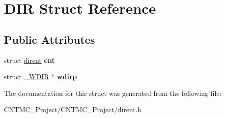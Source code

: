 \hypertarget{struct_d_i_r}{}\section{D\+I\+R Struct Reference}
\label{struct_d_i_r}
\subsection*{Public Attributes}
\begin{DoxyCompactItemize}
\item 
\hypertarget{struct_d_i_r_a59e9f5211cbb2f8e5b2807ccfdd2a7fc}{}struct \hyperlink{structdirent}{dirent} {\bfseries ent}\label{struct_d_i_r_a59e9f5211cbb2f8e5b2807ccfdd2a7fc}

\item 
\hypertarget{struct_d_i_r_a29362d4a3d7f809d0f5418b26cac5d41}{}struct \hyperlink{struct___w_d_i_r}{\+\_\+\+W\+D\+I\+R} $\ast$ {\bfseries wdirp}\label{struct_d_i_r_a29362d4a3d7f809d0f5418b26cac5d41}

\end{DoxyCompactItemize}


The documentation for this struct was generated from the following file\+:\begin{DoxyCompactItemize}
\item 
C\+N\+T\+M\+C\+\_\+\+Project/\+C\+N\+T\+M\+C\+\_\+\+Project/dirent.\+h\end{DoxyCompactItemize}
